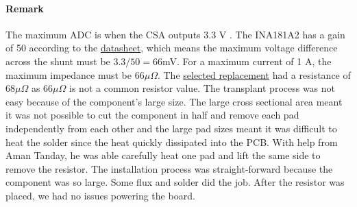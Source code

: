 \paragraph{Remark}
The maximum ADC is when the CSA outputs 3.3 V \cite{TI-Manchukonda2019ShuntResistorQuiz}. The INA181A2 has a gain of 50 according to the \href{https://www.ti.com/lit/ds/symlink/ina181.pdf?ts=1775027611016&ref_url=https%253A%252F%252Fau.mouser.com%252F}{datasheet}, which means the maximum voltage difference across the shunt must be $3.3/50=66$mV. For a maximum current of 1 A, the maximum impedance must be $66\mu\Omega$. The \href{https://au.mouser.com/ProductDetail/TE-Connectivity-Holsworthy/TLRP3A30CR068FTE?qs=QNEnbhJQKvaIeoPRm6mvGw%3D%3D}{selected replacement} had a resistance of $68\mu\Omega$ as $66\mu\Omega$ is not a common resistor value.
\nl
The transplant process was not easy because of the component's large size. The large cross sectional area meant it was not possible to cut the component in half and remove each pad independently from each other and the large pad sizes meant it was difficult to heat the solder since the heat quickly dissipated into the PCB.
With help from Aman Tanday, he was able carefully heat one pad and lift the same side to remove the resistor.
\nl
The installation process was straight-forward because the component was so large. Some flux and solder did the job. After the resistor was placed, we had no issues powering the board.